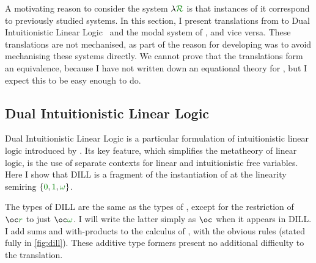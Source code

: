 \newcommand\instDILL{\gr{01\omega}}
\newcommand\instPD{\gr{01\Box}}

\newcommand\unused{\gr0}
\newcommand\true{\gr1}
\newcommand\valid{\gr\Box}

A motivating reason to consider the system $\name$ is that
instances of it correspond to previously studied systems.
In this section, I present translations from \name{} to Dual Intuitionistic
Linear Logic~\citep{Barber1996} and the modal system of \citet{judgmental},
and vice versa.
These translations are not mechanised, as part of the reason for developing
\name{} was to avoid mechanising these systems directly.
We cannot prove that the translations form an equivalence, because I have not
written down an equational theory for \name{}, but I expect this to be easy
enough to do.

\subsection{Dual Intuitionistic Linear Logic}\label{sec:trans-dill}

Dual Intuitionistic Linear Logic is a particular formulation of intuitionistic
linear logic introduced by \citet{Barber1996}.
Its key feature, which simplifies the metatheory of linear logic, is the use of
separate contexts for linear and intuitionistic free variables.
Here I show that DILL is a fragment of the instantiation of \name{} at the
linearity semiring $\{\gr0, \gr1, \gr\omega\}$.

The types of DILL are the same as the types of \name, except for the
restriction of $\oc\gr{r}$ to just $\oc\gr\omega$.
I will write the latter simply as $\oc$ when it appears in DILL\@.
I add sums and with-products to the calculus of \cite{Barber1996}, with the
obvious rules (stated fully in \cref{fig:dill}).
These additive type formers present no additional difficulty to the translation.

